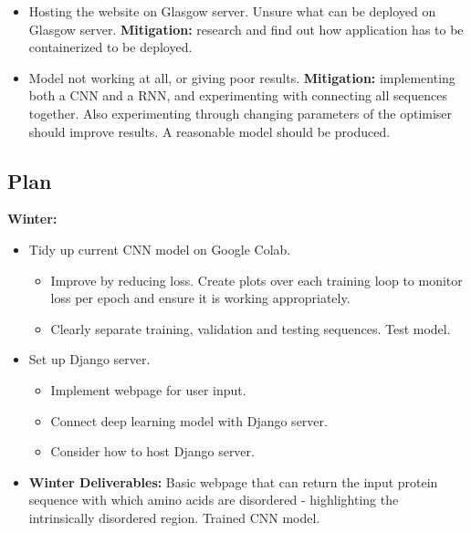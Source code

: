 \documentclass[11pt]{article}
\begin{document}
\begin{itemize}
    \item{Hosting the website on Glasgow server. Unsure what can be deployed on Glasgow server. \textbf{Mitigation:} research and find out how application has to be containerized to be deployed.}
    \item{Model not working at all, or giving poor results. \textbf{Mitigation:} implementing both a CNN and a RNN, and experimenting with connecting all sequences together. Also experimenting through changing parameters of the optimiser should improve results. A reasonable model should be produced.}
\end{itemize}

\subsection{Plan}\label{plan}

\textbf{Winter:}
\begin{itemize}
    \item{Tidy up current CNN model on Google Colab.}
    \begin{itemize}
        \item{Improve by reducing loss. Create plots over each training loop to monitor loss per epoch and ensure it is working appropriately.}
        \item{Clearly separate training, validation and testing sequences. Test model.}
    \end{itemize}
    \item{Set up Django server.}
    \begin{itemize}
        \item{Implement webpage for user input.}
        \item{Connect deep learning model with Django server.}
        \item{Consider how to host Django server.}
    \end{itemize}
    \item{\textbf{Winter Deliverables:} Basic webpage that can return the input protein sequence with which amino acids are disordered - highlighting the intrinsically disordered region. Trained CNN model.}
\end{itemize}
\end{document}
